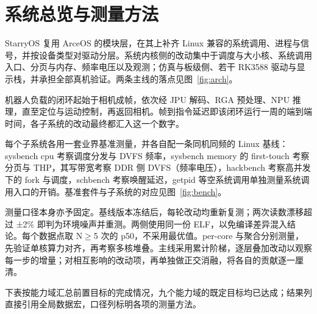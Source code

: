 \section{系统总览与测量方法}

StarryOS 复用 ArceOS 的模块层，在其上补齐 Linux 兼容的系统调用、进程与信号，并按设备类型对驱动分层。系统内核侧的改动集中于调度与大小核、系统调用入口、分页与内存、频率电压以及观测；仿真与板级侧、若干 RK3588 驱动与显示栈，并承担全部真机验证。两条主线的落点见图~\ref{fig:arch}。


机器人负载的闭环起始于相机成帧，依次经 JPU 解码、RGA 预处理、NPU 推理，直至定位与运动控制，再返回相机。帧到指令延迟即该闭环运行一周的端到端时间，各子系统的改动最终都汇入这一个数字。


每个子系统各用一套业界基准测量，并各自配一条同机同频的 Linux 基线：sysbench cpu 考察调度分发与 DVFS 频率，sysbench memory 的 first-touch 考察分页与 THP，其写带宽考察 DDR 侧 DVFS（频率电压），hackbench 考察高并发下的 fork 与调度，schbench 考察唤醒延迟，getpid 等空系统调用单独测量系统调用入口的开销。基准套件与子系统的对应见图~\ref{fig:bench}。


测量口径本身亦予固定。基线版本冻结后，每轮改动均重新复测；两次读数漂移超过 ±2\% 即判为环境噪声并重测。两侧使用同一份 ELF，以免编译差异混入结论。每个数据点取 N$\geq$5 次的 p50，不采用最优值。per-core 与聚合分别测量，先验证单核算力对齐，再考察多核堆叠。主线采用累计阶梯，逐层叠加改动以观察每一步的增量；对相互影响的改动项，再单独做正交消融，将各自的贡献逐一厘清。

下表按能力域汇总前置目标的完成情况，九个能力域的既定目标均已达成；结果列直接引用全局数据宏，口径列标明各项的测量方法。


